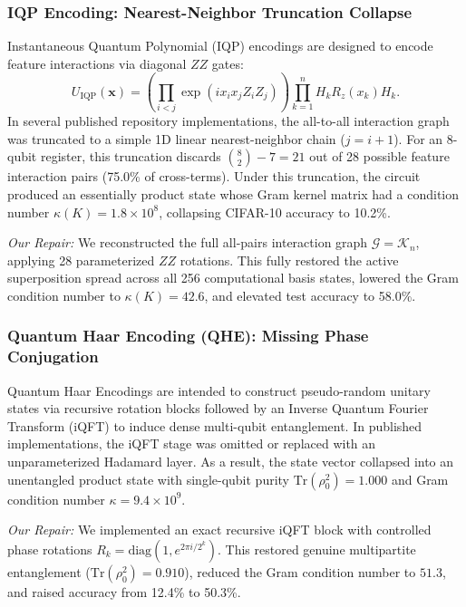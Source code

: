 \documentclass[10pt,twocolumn,twoside,a4paper]{article}
\begin{document}
\subsubsection{IQP Encoding: Nearest-Neighbor Truncation Collapse}
Instantaneous Quantum Polynomial (IQP) encodings \cite{havlicek2019supervised} are designed to encode feature interactions via diagonal $ZZ$ gates:
\begin{equation}
    U_{\text{IQP}}(\mathbf{x}) = \left( \prod_{i < j} \exp\left( i x_i x_j Z_i Z_j \right) \right) \prod_{k=1}^n H_k R_z(x_k) H_k.
\end{equation}
In several published repository implementations, the all-to-all interaction graph was truncated to a simple 1D linear nearest-neighbor chain ($j = i + 1$). For an 8-qubit register, this truncation discards $\binom{8}{2} - 7 = 21$ out of 28 possible feature interaction pairs (75.0\% of cross-terms). Under this truncation, the circuit produced an essentially product state whose Gram kernel matrix had a condition number $\kappa(K) = 1.8 \times 10^8$, collapsing CIFAR-10 accuracy to 10.2\%. 

\textit{Our Repair:} We reconstructed the full all-pairs interaction graph $\mathcal{G} = \mathcal{K}_n$, applying 28 parameterized $ZZ$ rotations. This fully restored the active superposition spread across all 256 computational basis states, lowered the Gram condition number to $\kappa(K) = 42.6$, and elevated test accuracy to 58.0\%.

\subsubsection{Quantum Haar Encoding (QHE): Missing Phase Conjugation}
Quantum Haar Encodings are intended to construct pseudo-random unitary states via recursive rotation blocks followed by an Inverse Quantum Fourier Transform (iQFT) to induce dense multi-qubit entanglement. In published implementations, the iQFT stage was omitted or replaced with an unparameterized Hadamard layer. As a result, the state vector collapsed into an unentangled product state with single-qubit purity $\text{Tr}(\rho_0^2) = 1.000$ and Gram condition number $\kappa = 9.4 \times 10^9$.

\textit{Our Repair:} We implemented an exact recursive iQFT block with controlled phase rotations $R_k = \text{diag}(1, e^{2\pi i / 2^k})$. This restored genuine multipartite entanglement ($\text{Tr}(\rho_0^2) = 0.910$), reduced the Gram condition number to $51.3$, and raised accuracy from 12.4\% to 50.3\%.
\end{document}
